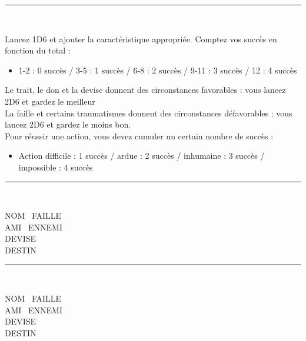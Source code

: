 \documentclass[12pt,twoside,a5paper]{article}
\begin{document}
\hrule~\\

\begin{minipage}[h]{0.05\textwidth}  \end{minipage} \hfill \begin{minipage}[h]{0.95\textwidth}
	{ 	\scriptsize
		Lancez 1D6 et ajouter la caractéristique appropriée. Comptez vos succès en fonction du total :
		\begin{itemize}
			\item[] 1-2 : 0 succès / 3-5 : 1 succès / 6-8 : 2 succès / 9-11 : 3 succès / 12 : 4 succès
		\end{itemize}
		Le trait, le don et la devise donnent des circonstances favorables : vous lancez 2D6 et gardez le meilleur~\\
		La faille et certains traumatismes donnent des circonstances défavorables : vous lancez 2D6 et gardez le moins bon.~\\
		Pour réussir une action, vous devez cumuler un certain nombre de succès :
		\begin{itemize}
			\item[] Action difficile : 1 succès / ardue : 2 succès / inhumaine : 3 succès / impossible : 4 succès
		\end{itemize}
	}
\end{minipage}

\clearpage

\hrule~\\

\begin{minipage}[h]{0.05\textwidth}  \end{minipage} \hfill \begin{minipage}[h]{0.95\textwidth}
	NOM \hrulefill~FAILLE \hrulefill~\\
	AMI \hrulefill~ENNEMI \hrulefill~\\
	DEVISE \hrulefill~\\
	DESTIN \hrulefill~\Ovalbox{~} \Ovalbox{~} \Ovalbox{~} \Ovalbox{~} \Ovalbox{~}~\\
\end{minipage}

\hrule~\\

\begin{minipage}[h]{0.05\textwidth}  \end{minipage} \hfill \begin{minipage}[h]{0.95\textwidth}
	NOM \hrulefill~FAILLE \hrulefill~\\
	AMI \hrulefill~ENNEMI \hrulefill~\\
	DEVISE \hrulefill~\\
	DESTIN \hrulefill~\Ovalbox{~} \Ovalbox{~} \Ovalbox{~} \Ovalbox{~} \Ovalbox{~}~\\
\end{minipage}
\end{document}
